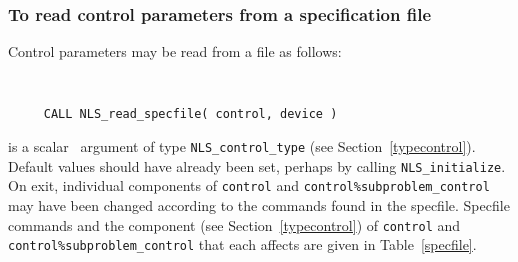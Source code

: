 \documentclass{galahad}
\newcommand{\packagename}{NLS}
\begin{document}
\subsubsection{To read control parameters from a specification file}
\label{readspec}

Control parameters may be read from a file as follows:
\hskip0.5in
\def\baselinestretch{0.8} {\tt
\begin{verbatim}
     CALL NLS_read_specfile( control, device )
\end{verbatim}
}
\def\baselinestretch{1.0}

\begin{description}
 is a scalar \intentinout\ argument of type
{\tt \packagename\_control\_type}
(see Section~\ref{typecontrol}).
Default values should have already been set, perhaps by calling
{\tt \packagename\_initialize}.
On exit, individual components of {\tt control} and
{\tt control\%subproblem\_control}
may have been changed
according to the commands found in the specfile. Specfile commands and
the component (see Section~\ref{typecontrol}) of {\tt control}
and {\tt control\%subproblem\_control}
that each affects are given in Table~\ref{specfile}.


\end{description}
\end{document}
